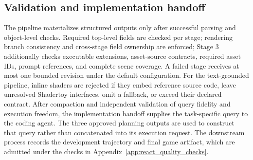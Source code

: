 \documentclass{article}
\begin{document}
\subsection{Validation and implementation handoff}
\label{app:harness_validation}

The pipeline materializes structured outputs only after successful parsing and object-level checks. Required top-level fields are checked per stage; rendering branch consistency and cross-stage field ownership are enforced; Stage 3 additionally checks executable extensions, asset-source contracts, required asset IDs, prompt references, and complete scene coverage. A failed stage receives at most one bounded revision under the default configuration. For the text-grounded pipeline, inline shaders are rejected if they embed reference source code, leave unresolved Shadertoy interfaces, omit a fallback, or exceed their declared contract. After compaction and independent validation of query fidelity and execution freedom, the implementation handoff supplies the task-specific query to the coding agent. The three approved planning outputs are used to construct that query rather than concatenated into its execution request. The downstream process records the development trajectory and final game artifact, which are admitted under the checks in Appendix~\ref{app:react_quality_checks}.
\end{document}
